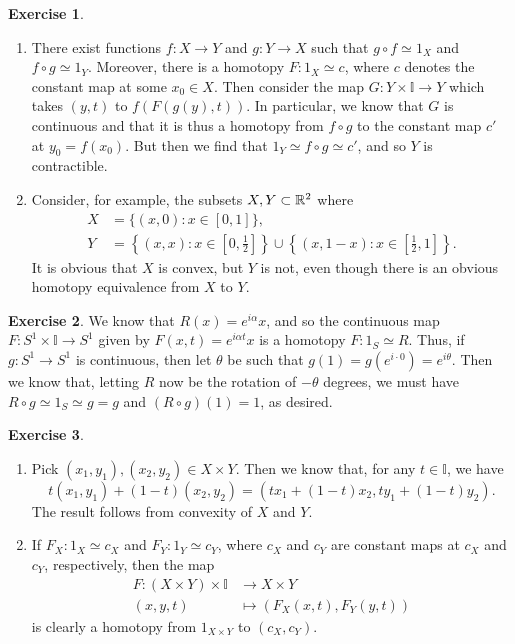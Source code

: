 \documentclass[10pt]{article}
\theoremstyle{definition}
\newtheorem{intex}{Exercise}[section]
\newenvironment{exercise}{\begin{intex}\label{\theintex}}{\end{intex}}
\newcommand*\II{\mathbb I}
\begin{document}
\begin{exercise} \leavevmode
\begin{enumerate}
\item There exist functions $f:X\to Y$ and $g:Y\to X$ such that $g\circ f\simeq1_X$ and $f\circ g\simeq1_Y$. Moreover, there is a homotopy $F:1_X\simeq c$, where $c$ denotes the constant map at some $x_0\in X$. Then consider the map $G:Y\times\II\to Y$ which takes $(y,t)$ to $f(F(g(y),t))$. In particular, we know that $G$ is continuous and that it is thus a homotopy from $f\circ g$ to the constant map $c'$ at $y_0=f(x_0)$. But then we find that $1_Y\simeq f\circ g\simeq c'$, and so $Y$ is contractible. 

\item Consider, for example, the subsets $X,Y\subset\mathbb{R}^2$ where \begin{align*}X&=\{(x,0):x\in[0,1]\},\\Y&=\left\{(x,x):x\in\left[0,\frac12\right]\right\}\cup\left\{(x,1-x):x\in\left[\frac12,1\right]\right\}.\end{align*} It is obvious that $X$ is convex, but $Y$ is not, even though there is an obvious homotopy equivalence from $X$ to $Y$. 
\end{enumerate}
\end{exercise} 

\begin{exercise} \leavevmode
We know that $R(x)=e^{i\alpha}x$, and so the continuous map $F:S^1\times\II\to S^1$ given by $F(x,t)=e^{i\alpha t}x$ is a homotopy $F:1_S\simeq R$. Thus, if $g:S^1\to S^1$ is continuous, then let $\theta$ be such that $g(1)=g(e^{i\cdot0})=e^{i\theta}$. Then we know that, letting $R$ now be the rotation of $-\theta$ degrees, we must have $R\circ g\simeq 1_S\simeq g=g$ and $(R\circ g)(1)=1$, as desired. 
\end{exercise} 

\begin{exercise} \leavevmode
\begin{enumerate}
\item Pick $(x_1,y_1),(x_2,y_2)\in X\times Y$. Then we know that, for any $t\in\II$, we have \[t(x_1,y_1)+(1-t)(x_2,y_2)=(tx_1+(1-t)x_2,ty_1+(1-t)y_2).\] The result follows from convexity of $X$ and $Y$. 

\item If $F_X:1_X\simeq c_X$ and $F_Y:1_Y\simeq c_Y$, where $c_X$ and $c_Y$ are constant maps at $c_X$ and $c_Y$, respectively, then the map \begin{align*}F:(X\times Y)\times\II&\to X\times Y\\(x,y,t)&\mapsto(F_X(x,t),F_Y(y,t))\end{align*} is clearly a homotopy from $1_{X\times Y}$ to $(c_X,c_Y)$. 
\end{enumerate} 
\end{exercise} 
\end{document}

